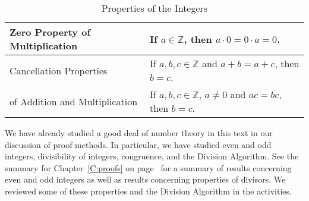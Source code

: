\begin{table}[h]
\begin{center}
\begin{tabular}{| p{1.6in} | p{3in} |} \hline
Zero Property of Multiplication  &   If  $a \in \mathbb{Z}$, then  $a \cdot 0 = 0 \cdot a = 0$.
 \\ \hline
Cancellation Properties &  If  $a, b, c \in \mathbb{Z}$ and  
$a + b = a + c$, then  $b = c$.  \\ 
of Addition and Multiplication   &  If  $a, b, c \in \mathbb{Z}$, $a \ne 0$ and  $ac = bc$, then  $b = c$.  \\ \hline
\end{tabular}
     \caption{Properties of the Integers}
     \label{Ta:propertiesofintegers}
\end{center} 
\end{table} 
%
We have already studied a good deal of number theory in this text in our discussion of proof methods.  In particular, we have studied even and odd integers, divisibility of integers, congruence, and the Division Algorithm.  See the summary for Chapter~\ref{C:proofs} on 
page~\pageref{SS:evenodd} for a summary of results concerning even and odd integers as well as results concerning properties of divisors.
We reviewed some of these properties and the Division Algorithm in the \typel activities.
\hbreak

\endinput
